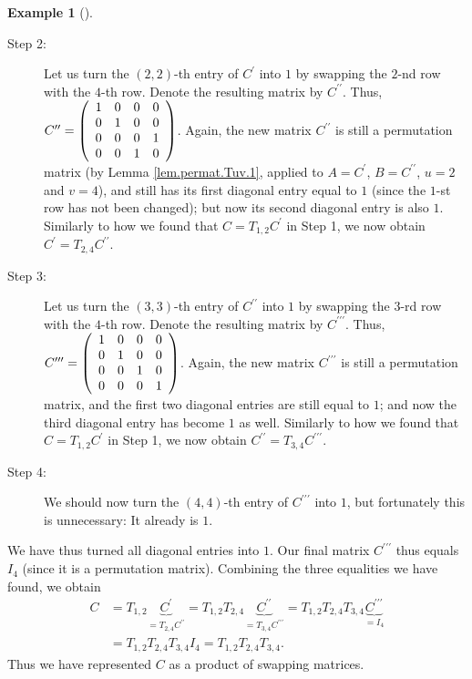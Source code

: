 \documentclass[numbers=enddot,12pt,final,onecolumn,notitlepage]{scrartcl}%
\theoremstyle{definition}
\newtheorem{exam}[theo]{Example}
\newenvironment{example}[1][]
{\begin{exam}[#1]\begin{leftbar}}
{\end{leftbar}\end{exam}}
\begin{document}
\begin{example}
\begin{description}
\item[Step 2:] Let us turn the $\left(  2,2\right)  $-th entry of $C^{\prime}$
into $1$ by swapping the $2$-nd row with the $4$-th row. Denote the resulting
matrix by $C^{\prime\prime}$. Thus, $C^{\prime\prime}=\left(
\begin{array}
[c]{cccc}%
1 & 0 & 0 & 0\\
0 & 1 & 0 & 0\\
0 & 0 & 0 & 1\\
0 & 0 & 1 & 0
\end{array}
\right)  $. Again, the new matrix $C^{\prime\prime}$ is still a permutation
matrix (by Lemma \ref{lem.permat.Tuv.1}, applied to $A=C^{\prime}$,
$B=C^{\prime\prime}$, $u=2$ and $v=4$), and still has its first diagonal entry
equal to $1$ (since the $1$-st row has not been changed); but now its second
diagonal entry is also $1$. Similarly to how we found that $C=T_{1,2}%
C^{\prime}$ in Step 1, we now obtain $C^{\prime}=T_{2,4}C^{\prime\prime}$.

\item[Step 3:] Let us turn the $\left(  3,3\right)  $-th entry of
$C^{\prime\prime}$ into $1$ by swapping the $3$-rd row with the $4$-th row.
Denote the resulting matrix by $C^{\prime\prime\prime}$. Thus, $C^{\prime
\prime\prime}=\left(
\begin{array}
[c]{cccc}%
1 & 0 & 0 & 0\\
0 & 1 & 0 & 0\\
0 & 0 & 1 & 0\\
0 & 0 & 0 & 1
\end{array}
\right)  $. Again, the new matrix $C^{\prime\prime\prime}$ is still a
permutation matrix, and the first two diagonal entries are still equal to $1$;
and now the third diagonal entry has become $1$ as well. Similarly to how we
found that $C=T_{1,2}C^{\prime}$ in Step 1, we now obtain $C^{\prime\prime
}=T_{3,4}C^{\prime\prime\prime}$.

\item[Step 4:] We should now turn the $\left(  4,4\right)  $-th entry of
$C^{\prime\prime\prime}$ into $1$, but fortunately this is unnecessary: It
already is $1$.
\end{description}

We have thus turned all diagonal entries into $1$. Our final matrix
$C^{\prime\prime\prime}$ thus equals $I_{4}$ (since it is a permutation
matrix). Combining the three equalities we have found, we obtain%
\begin{align*}
C  &  =T_{1,2}\underbrace{C^{\prime}}_{=T_{2,4}C^{\prime\prime}}%
=T_{1,2}T_{2,4}\underbrace{C^{\prime\prime}}_{=T_{3,4}C^{\prime\prime\prime}%
}=T_{1,2}T_{2,4}T_{3,4}\underbrace{C^{\prime\prime\prime}}_{=I_{4}}\\
&  =T_{1,2}T_{2,4}T_{3,4}I_{4}=T_{1,2}T_{2,4}T_{3,4}.
\end{align*}
Thus we have represented $C$ as a product of swapping matrices.
\end{example}
\end{document}
